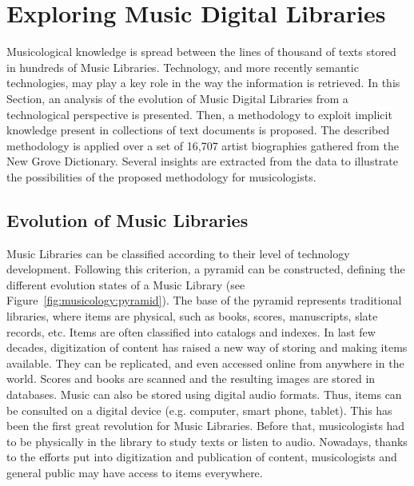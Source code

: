 \section{Exploring Music Digital Libraries}

Musicological knowledge is spread between the lines of thousand of texts stored in hundreds of Music Libraries. Technology, and more recently semantic technologies, may play a key role in the way the information is retrieved. In this Section, an analysis of the evolution of Music Digital Libraries from a technological perspective is presented. Then, a methodology to exploit implicit knowledge present in collections of text documents is proposed. The described methodology is applied over a set of 16,707 artist biographies gathered from the New Grove Dictionary. 
Several insights are extracted from the data to illustrate the possibilities of the proposed methodology for musicologists.

\subsection{Evolution of Music Libraries}

Music Libraries can be classified according to their level of technology development. Following this criterion, a pyramid can be constructed, defining the different evolution states of a Music Library (see Figure~\ref{fig:musicology:pyramid}). The base of the pyramid represents traditional libraries, where items are physical, such as books, scores, manuscripts, slate records, etc. Items are often classified into catalogs and indexes. In last few decades, digitization of content has raised a new way of storing and making items available. They can be replicated, and even accessed online from anywhere in the world. Scores and books are scanned and the resulting images are stored in databases. Music can also be stored using digital audio formats. Thus, items can be consulted on a digital device (e.g. computer, smart phone, tablet). This has been the first great revolution for Music Libraries. Before that, musicologists had to be physically in the library to study texts or listen to audio. Nowadays, thanks to the efforts put into digitization and publication of content, musicologists and general public may have access to items everywhere.

